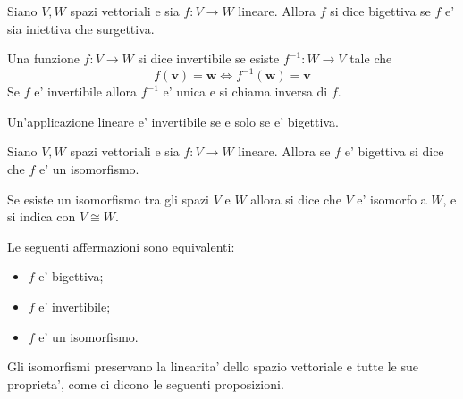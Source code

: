 \begin{definition}
    Siano $V, W$ spazi vettoriali e sia $f : V \to W$ lineare. Allora $f$ si dice bigettiva se $f$ e' sia iniettiva che surgettiva.
\end{definition}

\begin{definition}
    Una funzione $f : V \to W$ si dice invertibile se esiste $f^{-1} : W \to V$ tale che \begin{equation}
        f(\bm{v}) = \bm{w} \iff f^{-1}(\bm{w}) = \bm{v}
    \end{equation}
    Se $f$ e' invertibile allora $f^{-1}$ e' unica e si chiama inversa di $f$.
\end{definition}

\begin{remark}
    Un'applicazione lineare e' invertibile se e solo se e' bigettiva. 
\end{remark}

\begin{definition}
    Siano $V, W$ spazi vettoriali e sia $f : V \to W$ lineare. Allora se $f$ e' bigettiva si dice che $f$ e' un isomorfismo.
    
    Se esiste un isomorfismo tra gli spazi $V$ e $W$ allora si dice che $V$ e' isomorfo a $W$, e si indica con $V \cong W$.
\end{definition}

\begin{remark}
    Le seguenti affermazioni sono equivalenti:
    \begin{itemize}
        \item $f$ e' bigettiva;
        \item $f$ e' invertibile;
        \item $f$ e' un isomorfismo.
    \end{itemize}
\end{remark}

Gli isomorfismi preservano la linearita' dello spazio vettoriale e tutte le sue proprieta', come ci dicono le seguenti proposizioni.

